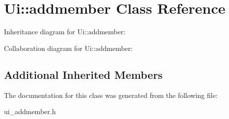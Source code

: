 \section{Ui\+:\+:addmember Class Reference}
\label{class_ui_1_1addmember}


Inheritance diagram for Ui\+:\+:addmember\+:


Collaboration diagram for Ui\+:\+:addmember\+:
\subsection*{Additional Inherited Members}


The documentation for this class was generated from the following file\+:\begin{DoxyCompactItemize}
\item 
ui\+\_\+addmember.\+h\end{DoxyCompactItemize}
